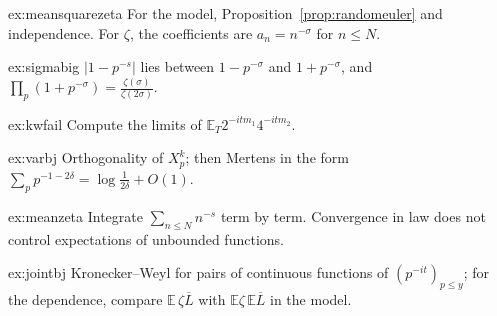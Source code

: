 \begin{hint}{ex:meansquarezeta}
For the model, Proposition~\ref{prop:randomeuler} and independence. For $\zeta$, the coefficients are $a_n=n^{-\sigma}$ for $n\le N$.
\end{hint}
\begin{hint}{ex:sigmabig}
$|1-p^{-s}|$ lies between $1-p^{-\sigma}$ and $1+p^{-\sigma}$, and $\prod_p(1+p^{-\sigma})=\frac{\zeta(\sigma)}{\zeta(2\sigma)}$.
\end{hint}
\begin{hint}{ex:kwfail}
Compute the limits of $\mathbb E_T2^{-itm_1}4^{-itm_2}$.
\end{hint}
\begin{hint}{ex:varbj}
Orthogonality of $X_p^k$; then Mertens in the form $\sum_pp^{-1-2\delta}=\log\frac1{2\delta}+O(1)$.
\end{hint}
\begin{hint}{ex:meanzeta}
Integrate $\sum_{n\le N}n^{-s}$ term by term. Convergence in law does not control expectations of unbounded functions.
\end{hint}
\begin{hint}{ex:jointbj}
Kronecker--Weyl for pairs of continuous functions of $(p^{-it})_{p\le y}$; for the dependence, compare $\mathbb E\,\zeta\overline{L}$ with $\mathbb E\zeta\,\mathbb E\overline L$ in the model.
\end{hint}

